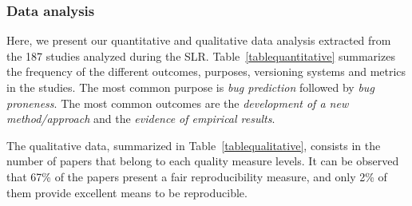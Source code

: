 \documentclass[a4paper, 12pt]{book}
\begin{document}
\subsubsection{Data analysis}


Here, we present our quantitative and qualitative data analysis extracted from the 187 studies analyzed during the SLR. Table~\ref{tablequantitative} summarizes the frequency of the different outcomes, purposes, versioning systems and  metrics in the studies. 
The most common purpose is \emph{bug prediction} followed by \emph{bug proneness}. %
The most common outcomes are the \emph{development of a new method/approach} and the \emph{evidence of empirical results}. %

The qualitative data, summarized in Table~\ref{tablequalitative}, consists in the number of papers that belong to each quality measure levels. It can be observed that 67\% of the papers present a fair reproducibility measure, and only 2\% of them provide excellent means to be reproducible. 
\end{document}
